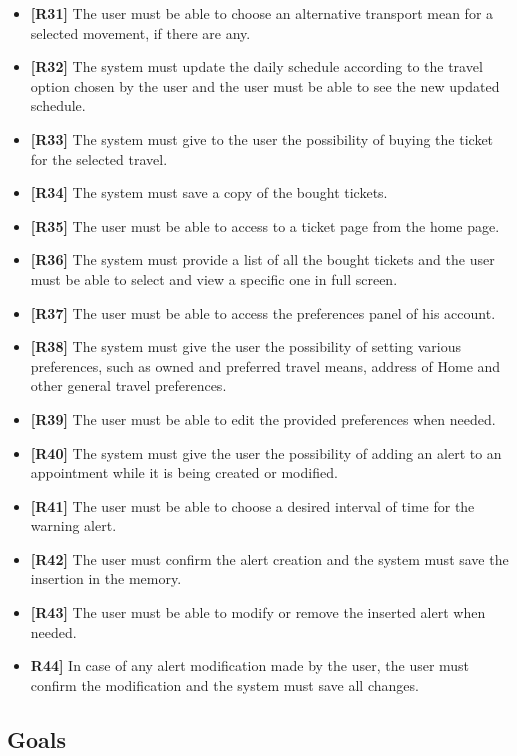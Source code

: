 \begin{itemize}
	\item \textbf{[R31]} The user must be able to choose an alternative transport mean for a selected movement, if there are any.
	\item \textbf{[R32]} The system must update the daily schedule according to the travel option chosen by the user and the user must be able to see the new updated schedule.
	\item \textbf{[R33]} The system must give to the user the possibility of buying the ticket for the selected travel.
	\item \textbf{[R34]} The system must save a copy of the bought tickets.
	\item \textbf{[R35]} The user must be able to access to a ticket page from the home page.
	\item \textbf{[R36]} The system must provide a list of all the bought tickets and the user must be able to select and view a specific one in full screen.
	\item \textbf{[R37]} The user must be able to access the preferences panel of his account.
	\item \textbf{[R38]} The system must give the user the possibility of setting various preferences, such as owned and preferred travel means, address of Home and other general travel preferences.
	\item \textbf{[R39]} The user must be able to edit the provided preferences when needed.
	\item \textbf{[R40]} The system must give the user the possibility of adding an alert to an appointment while it is being created or modified.
	\item \textbf{[R41]} The user must be able to choose a desired interval of time for the warning alert.
	\item \textbf{[R42]} The user must confirm the alert creation and the system must save the insertion in the memory.
	\item \textbf{[R43]} The user must be able to modify or remove the inserted alert when needed.
	\item \textbf{R44]} In case of any alert modification made by the user, the user must confirm the modification and the system must save all changes.
	
\end{itemize}

\subsection{Goals}
